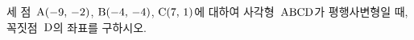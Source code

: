 세 점~$\mathrm{A}(-9,\mkern3mu -2)$, $\mathrm{B}(-4,\mkern3mu -4)$, $\mathrm{C}(7,\mkern3mu 1)$에 대하여 사각형~$\mathrm{ABCD}$가 평행사변형일 때, 꼭짓점~$\mathrm{D}$의 좌표를 구하시오.
